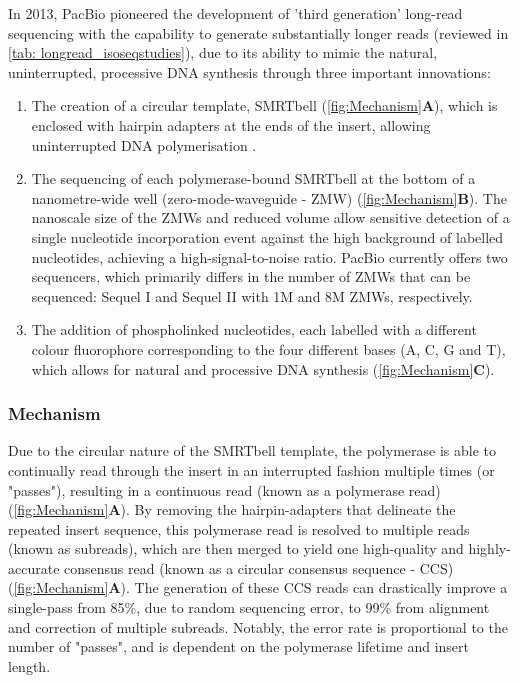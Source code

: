 In 2013, PacBio pioneered the development of 'third generation' long-read sequencing with the capability to generate substantially longer reads (reviewed in \cref{tab: longread_isoseqstudies}), due to its ability to mimic the natural, uninterrupted, processive DNA synthesis through three important innovations\cite{Eid2009}: 
\begin{enumerate}
	\item The creation of a circular template, SMRTbell (\cref{fig:Mechanism}\textbf{A}), which is enclosed with hairpin adapters at the ends of the insert, allowing uninterrupted DNA polymerisation \cite{Travers2010}.
	\item The sequencing of each polymerase-bound SMRTbell at the bottom of a nanometre-wide well (zero-mode-waveguide - ZMW)\cite{Levene2003} (\cref{fig:Mechanism}\textbf{B}). The nanoscale size of the ZMWs and reduced volume allow sensitive detection of a single nucleotide incorporation event against the high background of labelled nucleotides, achieving a high-signal-to-noise ratio. PacBio currently offers two sequencers, which primarily differs in the number of ZMWs that can be sequenced: Sequel I and Sequel II with 1M and 8M ZMWs, respectively.   
	\item The addition of phospholinked nucleotides, each labelled with a different colour fluorophore corresponding to the four different bases (A, C, G and T), which allows for natural and processive DNA synthesis\cite{Mccarthy2010} (\cref{fig:Mechanism}\textbf{C}). 
\end{enumerate}

\vspace{1cm}
\subsubsection{Mechanism}
Due to the circular nature of the SMRTbell template, the polymerase is able to continually read through the insert in an interrupted fashion multiple times (or "passes"), resulting in a continuous read (known as a polymerase read) (\cref{fig:Mechanism}\textbf{A}). By removing the hairpin-adapters that delineate the repeated insert sequence, this polymerase read is resolved to multiple reads (known as subreads), which are then merged to yield one high-quality and highly-accurate consensus read (known as a circular consensus sequence - CCS) (\cref{fig:Mechanism}\textbf{A}). The generation of these CCS reads can drastically improve a single-pass from 85\%, due to random sequencing error, to 99\% from alignment and correction of multiple subreads. Notably, the error rate is proportional to the number of "passes", and is dependent on the polymerase lifetime and insert length\cite{Travers2010}. 

